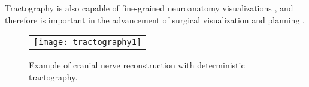 Tractography is also capable of fine-grained neuroanatomy visualizations \cite{Hodaie2010, Chen2015c}, and therefore is important in the advancement of surgical visualization \cite{Chen2011b,Rosen2015,Hodaie2012g,Taoka2006,Sherbondy2008,Muthusamy2007} and planning \cite{Golby2011}. 

\begin{figure}[ht]
\begin{center}
\begin{tabular}{c}
\texttt{[image: tractography1]}
\end{tabular}
\caption{Example of cranial nerve reconstruction with deterministic tractography.} 
\label{fig:tract1}
\end{center}
\end{figure}

